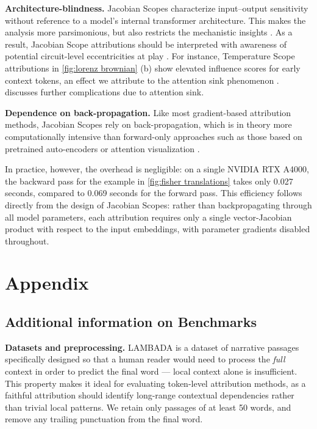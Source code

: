 \documentclass{article}
\begin{document}
\noindent\textbf{Architecture-blindness.}
Jacobian Scopes characterize input--output sensitivity without reference to a model’s internal transformer architecture.
This makes the analysis more parsimonious, but also restricts the mechanistic insights \cite{Clark-Berts-Attention-2019}.
As a result, Jacobian Scope attributions should be interpreted with awareness of potential circuit-level eccentricities at play \cite{ameisen2025circuit,lieberum2024gemmascopeopensparse}.
For instance, Temperature Scope attributions in \cref{fig:lorenz brownian} (b) show elevated influence scores for early context tokens, an effect we attribute to the attention sink phenomenon \cite{Xiao-attention-sink-2024}.
 discusses further complications due to attention sink.

\noindent\textbf{Dependence on back-propagation.}
Like most gradient-based attribution methods, Jacobian Scopes rely on back-propagation, which is in theory more computationally intensive than forward-only approaches such as those based on pretrained auto-encoders \cite{lieberum2024gemmascopeopensparse} or attention visualization \cite{Clark-Berts-Attention-2019}.

In practice, however, the overhead is negligible: on a single NVIDIA RTX A4000, the backward pass for the example in \cref{fig:fisher translations} takes only 0.027 seconds, compared to 0.069 seconds for the forward pass.
This efficiency follows directly from the design of Jacobian Scopes: rather than backpropagating through all model parameters, each attribution requires only a single vector-Jacobian product with respect to the input embeddings, with parameter gradients disabled throughout.





\appendix
\section{Appendix}
\subsection{Additional information on Benchmarks}
\label{sec:benchmark_details}

\noindent\textbf{Datasets and preprocessing.}
LAMBADA \cite{paperno-etal-2016-lambada} is a dataset of 
narrative passages specifically designed so that a human reader would 
need to process the \emph{full} context in order to predict the final 
word — local context alone is insufficient. This property makes it 
ideal for evaluating token-level attribution methods, as a faithful 
attribution should identify long-range contextual dependencies rather 
than trivial local patterns. We retain only passages of at least 50 
words, and remove any trailing punctuation from the final word.
\end{document}
